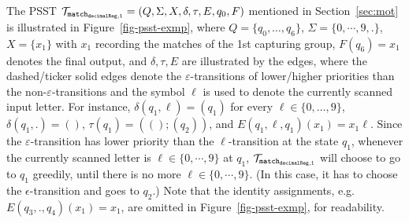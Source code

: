 \begin{example}
The PSST $\mathcal{T}_{\tt match_{decimalReg,1}}=(Q, \Sigma, X, \delta, \tau, E,  q_{0}, F)$ mentioned in Section~\ref{sec:mot} is illustrated in Figure~\ref{fig-psst-exmp}, where $Q = \{q_0, \dots, q_{6}\}$, $\Sigma = \{0,\cdots,9, .\}$, $X= \{x_1\}$ with $x_1$ recording the matches of the 1st capturing group, $F(q_{6}) = x_1$ denotes the final output, and $\delta, \tau, E$ are illustrated by the edges, where the dashed/ticker solid edges denote the $\varepsilon$-transitions of lower/higher priorities than the non-$\varepsilon$-transitions and the symbol $\ell$ is used to denote the currently scanned input letter. For instance, $\delta(q_1, \ell) = (q_1)$ for every $\ell \in \{0, \dots, 9\}$, $\delta(q_1, .) = ()$, $\tau(q_1) = ((); (q_2))$, and $E(q_1, \ell, q_1)(x_1) = x_1 \ell$. Since the $\varepsilon$-transition has lower priority than the $\ell$-transition at the state $q_1$, whenever the currently scanned letter is $\ell \in \{0,\cdots,9\}$ at $q_1$,  $\mathcal{T}_{\tt match_{decimalReg,1}}$ will choose to go to $q_1$ greedily, until there is no more $\ell  \in \{0,\cdots,9\}$. (In this case, it has to choose the $\epsilon$-transition and goes to $q_2$.) Note that the identity assignments, e.g. $E(q_3, ., q_4)(x_1) = x_1$, are omitted in Figure~\ref{fig-psst-exmp}, for readability. 
\begin{figure}[ht]
\centering

\end{figure}
\end{example}
